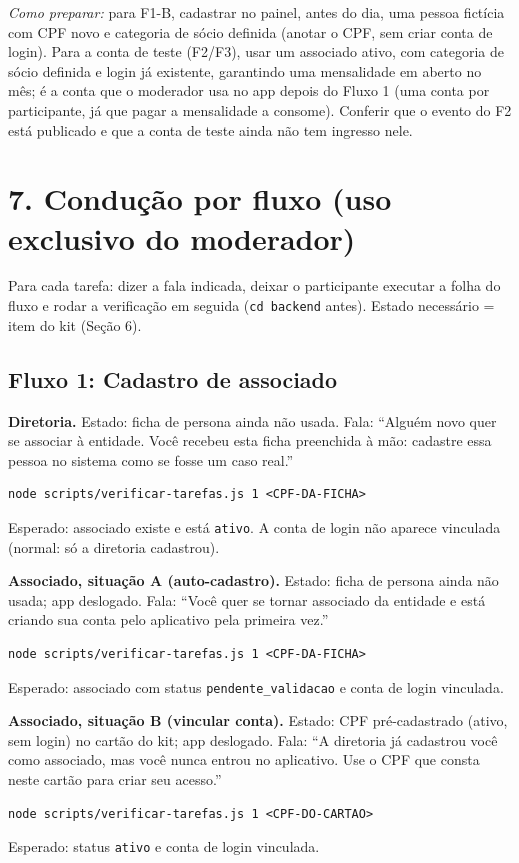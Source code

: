 \documentclass[11pt,a4paper]{article}
\begin{document}
\textit{Como preparar:} para F1-B, cadastrar no painel, antes do dia, uma pessoa fictícia com CPF
novo e categoria de sócio definida (anotar o CPF, sem criar conta de login). Para a conta de teste
(F2/F3), usar um associado ativo, com categoria de sócio definida e login já existente, garantindo
uma mensalidade em aberto no mês; é a conta que o moderador usa no app depois do Fluxo 1 (uma
conta por participante, já que pagar a mensalidade a consome). Conferir que o evento do F2 está
publicado e que a conta de teste ainda não tem ingresso nele.

\section*{7. Condução por fluxo (uso exclusivo do moderador)}

Para cada tarefa: dizer a fala indicada, deixar o participante executar a folha do fluxo e rodar a
verificação em seguida (\texttt{cd backend} antes). Estado necessário = item do kit (Seção 6).

\subsection*{Fluxo 1: Cadastro de associado}

\textbf{Diretoria.} Estado: ficha de persona ainda não usada. Fala: ``Alguém novo quer se associar à
entidade. Você recebeu esta ficha preenchida à mão: cadastre essa pessoa no sistema como se
fosse um caso real.''
\begin{verbatim}
node scripts/verificar-tarefas.js 1 <CPF-DA-FICHA>
\end{verbatim}
Esperado: associado existe e está \texttt{ativo}. A conta de login não aparece vinculada (normal:
só a diretoria cadastrou).

\textbf{Associado, situação A (auto-cadastro).} Estado: ficha de persona ainda não usada; app
deslogado. Fala: ``Você quer se tornar associado da entidade e está criando sua conta pelo
aplicativo pela primeira vez.''
\begin{verbatim}
node scripts/verificar-tarefas.js 1 <CPF-DA-FICHA>
\end{verbatim}
Esperado: associado com status \texttt{pendente\_validacao} e conta de login vinculada.

\textbf{Associado, situação B (vincular conta).} Estado: CPF pré-cadastrado (ativo, sem login) no
cartão do kit; app deslogado. Fala: ``A diretoria já cadastrou você como associado, mas você nunca
entrou no aplicativo. Use o CPF que consta neste cartão para criar seu acesso.''
\begin{verbatim}
node scripts/verificar-tarefas.js 1 <CPF-DO-CARTAO>
\end{verbatim}
Esperado: status \texttt{ativo} e conta de login vinculada.
\end{document}
